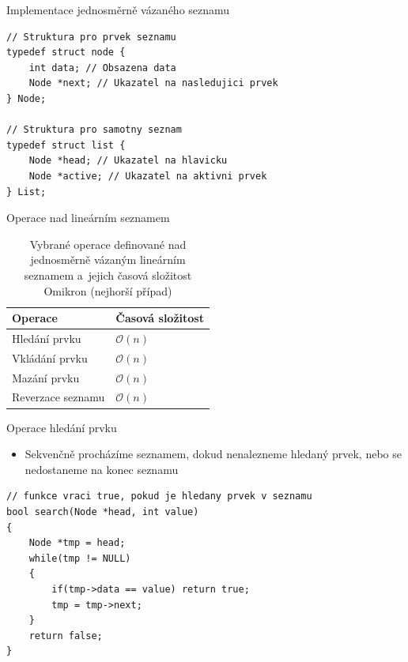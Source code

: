 \documentclass[10pt, hyperref={unicode}]{beamer}
\begin{document}
\begin{frame}[fragile]{Implementace jednosměrně vázaného seznamu}
\begin{lstlisting}[title=Ukázka definice struktur v~jazyce C:]
// Struktura pro prvek seznamu
typedef struct node {
    int data; // Obsazena data
    Node *next; // Ukazatel na nasledujici prvek
} Node;

// Struktura pro samotny seznam
typedef struct list {
    Node *head; // Ukazatel na hlavicku
    Node *active; // Ukazatel na aktivni prvek
} List;
\end{lstlisting}
\end{frame}


\begin{frame}{Operace nad lineárním seznamem}
\begin{table}[]
    \centering
    \caption{Vybrané operace definované nad \alert{jednosměrně} vázaným lineárním seznamem a~jejich časová složitost 
    Omikron (nejhorší případ)}
    \begin{tabular}{ll}
        \toprule
        \textbf{Operace} & \textbf{Časová složitost} \\
        \midrule
        Hledání prvku & \quad\quad\quad $\mathcal{O}(n)$ \\
        \midrule
        Vkládání prvku & \quad\quad\quad $\mathcal{O}(n)$ \\
        \midrule
        Mazání prvku & \quad\quad\quad $\mathcal{O}(n)$ \\
        \midrule
        Reverzace seznamu & \quad\quad\quad $\mathcal{O}(n)$ \\
        \bottomrule
    \end{tabular}
\end{table}
\end{frame}


\begin{frame}[fragile]{Operace hledání prvku}
\begin{itemize}
    \item Sekvenčně procházíme seznamem, dokud nenalezneme hledaný prvek, nebo se nedostaneme na konec seznamu
\end{itemize}
\begin{lstlisting}[title=Hledání v~(neseřazeném) seznamu v~jazyce C:]
// funkce vraci true, pokud je hledany prvek v seznamu
bool search(Node *head, int value)
{
    Node *tmp = head;
    while(tmp != NULL)
    {
        if(tmp->data == value) return true;
        tmp = tmp->next;
    }
    return false;
}
\end{lstlisting}
\end{frame}
\end{document}
